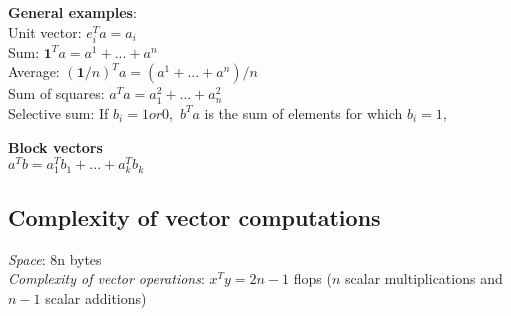 \textbf{General examples}:\\
\textbullet Unit vector: $e_i^T a = a_i$ \\
\textbullet Sum: $\textbf{1}^T a = a^1 + ... + a^n$ \\
\textbullet Average: $(\textbf{1}/n)^T a=(a^1+...+a^n)/n$\\ 
\textbullet Sum of squares: $a^Ta = a^2_1 +...+a^2_n$\\
\textbullet Selective sum: If $b_i = 1 or 0,$ \textit{$b^Ta$} is the sum of elements for which $b_i = 1$,

\textbf{Block vectors}\\
$a^T b = a_1^T b_1 + ... + a_k^T b_k$

\subsection{Complexity of vector computations}
\textit{Space}:  8n bytes\\
\textit{Complexity of vector operations}: $x^Ty=2n-1$ flops ($n$ scalar multiplications and $n-1$ scalar additions)

